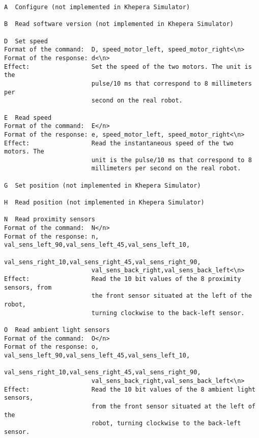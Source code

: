 \documentclass[a4paper,twoside]{article}
\begin{document}
\begin{verbatim}
A  Configure (not implemented in Khepera Simulator)

B  Read software version (not implemented in Khepera Simulator)

D  Set speed
Format of the command:  D, speed_motor_left, speed_motor_right<\n>
Format of the response: d<\n>
Effect:                 Set the speed of the two motors. The unit is the
                        pulse/10 ms that correspond to 8 millimeters per
                        second on the real robot.

E  Read speed
Format of the command:  E</n>
Format of the response: e, speed_motor_left, speed_motor_right<\n>
Effect:                 Read the instantaneous speed of the two motors. The
                        unit is the pulse/10 ms that correspond to 8
                        millimeters per second on the real robot.

G  Set position (not implemented in Khepera Simulator)

H  Read position (not implemented in Khepera Simulator)

N  Read proximity sensors
Format of the command:  N</n>
Format of the response: n, val_sens_left_90,val_sens_left_45,val_sens_left_10,
                        val_sens_right_10,val_sens_right_45,val_sens_right_90,
                        val_sens_back_right,val_sens_back_left<\n>
Effect:                 Read the 10 bit values of the 8 proximity sensors, from
                        the front sensor situated at the left of the robot,
                        turning clockwise to the back-left sensor.

O  Read ambient light sensors
Format of the command:  O</n>
Format of the response: o, val_sens_left_90,val_sens_left_45,val_sens_left_10,
                        val_sens_right_10,val_sens_right_45,val_sens_right_90,
                        val_sens_back_right,val_sens_back_left<\n>
Effect:                 Read the 10 bit values of the 8 ambient light sensors,
                        from the front sensor situated at the left of the
                        robot, turning clockwise to the back-left sensor.
\end{verbatim}

\newpage
\end{document}
